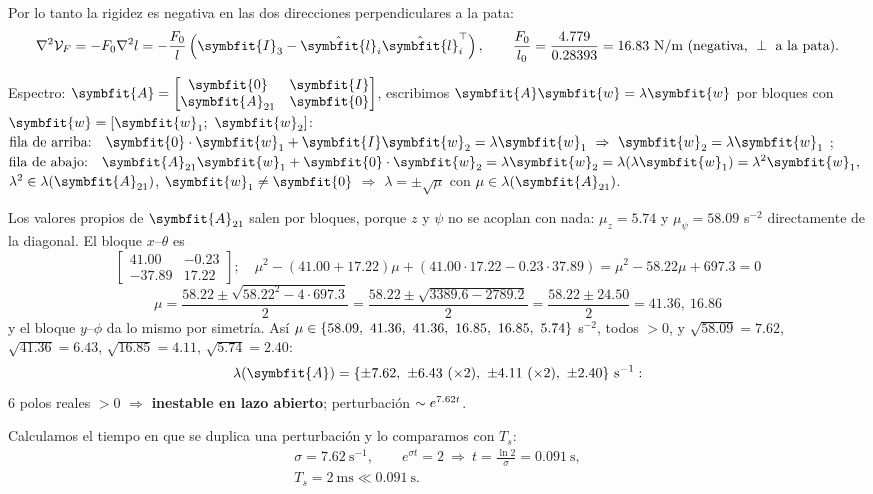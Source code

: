 \documentclass[11pt,a4paper]{article}
\makeatletter
\numberwithin{equation}{section}
\renewcommand\paragraph{\@startsection{paragraph}{4}{\z@}{1.4ex plus .4ex}{-0.6em}%
  {\normalfont\color{tinta}}}
\newenvironment{apunte}[2]{\par\noindent\ignorespaces}{\par}
\newenvironment{ojo}{\begin{apunte}{ojo}{Ojo:}}{\end{apunte}}
\newcommand{\vect}[1]{\symbfit{#1}}
\newcommand{\T}{^{\top}}
\makeatother
\begin{document}
Por lo tanto la rigidez es negativa en las dos direcciones perpendiculares a la pata:
\begin{equation*}
\nabla^2\mathcal V_F = -F_0\nabla^2l = -\frac{F_0}{l}\left(\vect I_3 - \hat{\vect l}_i\hat{\vect l}_i\T\right),\qquad \frac{F_0}{l_0} = \frac{4.779}{0.28393} = 16.83\ \text{N/m}\ \text{(negativa, }\perp\text{ a la pata)}.
\end{equation*}

\paragraph{Espectro:} $\vect A = \begin{bmatrix}\vect 0 & \vect I\\ \vect A_{21} & \vect 0\end{bmatrix}$, escribimos $\vect A\vect w = \lambda\vect w$ por bloques con $\vect w = [\vect w_1;\ \vect w_2]$:
$\displaystyle \text{fila de arriba:} \allowbreak\quad \vect 0\cdot\vect w_1 + \vect I\vect w_2 = \lambda\vect w_1 \ \Rightarrow\ \vect w_2 = \lambda\vect w_1$ ; $\displaystyle \text{fila de abajo:} \allowbreak\quad \vect A_{21}\vect w_1 + \vect 0\cdot\vect w_2 = \lambda\vect w_2 = \lambda(\lambda\vect w_1) = \lambda^2\vect w_1 ,$
$\lambda^2\in\lambda(\vect A_{21})$, $\vect w_1 \ne \vect 0$ $\Rightarrow$ $\lambda = \pm\sqrt\mu$ con $\mu\in\lambda(\vect A_{21})$.

Los valores propios de $\vect A_{21}$ salen por bloques, porque $z$ y $\psi$ no se acoplan con nada: $\mu_z = 5.74$ y $\mu_\psi = 58.09$ s$^{-2}$ directamente de la diagonal. El bloque $x$--$\theta$ es
\[
\begin{bmatrix}41.00 & -0.23\\ -37.89 & 17.22\end{bmatrix} ;\quad \mu^2 - (41.00 + 17.22)\mu + (41.00\cdot17.22 - 0.23\cdot37.89) = \mu^2 - 58.22\mu + 697.3 = 0
\]
\[
\mu = \frac{58.22 \pm \sqrt{58.22^2 - 4\cdot697.3}}{2} = \frac{58.22 \pm \sqrt{3389.6 - 2789.2}}{2} = \frac{58.22 \pm 24.50}{2} = 41.36,\ 16.86
\]
y el bloque $y$--$\phi$ da lo mismo por simetría. Así $\mu\in\{58.09,\allowbreak\ 41.36,\allowbreak\ 41.36,\allowbreak\ 16.85,\allowbreak\ 16.85,\allowbreak\ 5.74\}$ s$^{-2}$, todos $> 0$, y $\sqrt{58.09} = 7.62$, $\sqrt{41.36} = 6.43$, $\sqrt{16.85} = 4.11$, $\sqrt{5.74} = 2.40$:
\begin{equation*}
\lambda(\vect A) = \{\PolosLA\}\ \text{s}^{-1}:
\end{equation*}
6 polos reales $> 0$ $\Rightarrow$ \textbf{inestable en lazo abierto}; perturbación $\sim e^{7.62 t}$.
\begin{ojo}
Calculamos el tiempo en que se duplica una perturbación y lo comparamos con $T_s$:
\begin{gather*}
\sigma = 7.62\ \text{s}^{-1},\qquad e^{\sigma t} = 2 \ \Rightarrow\ t = \frac{\ln2}{\sigma} = 0.091\ \text{s}, \\
T_s = 2\ \text{ms} \ll 0.091\ \text{s}.
\end{gather*}
\end{ojo}
\end{document}
